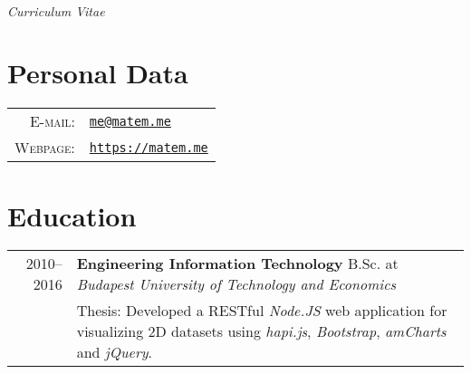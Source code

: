 \documentclass[a4paper,10pt]{article} %
\begin{document}
\pagestyle{empty} %

\par{}\\ \emph{Curriculum Vitae}\bigskip


\section{Personal Data}
\begin{tabular}{rl}
\textsc{E-mail:} & \href{mailto:me@matem.me}{\texttt{me@matem.me}} \\
\textsc{Webpage:} & \href{https://matem.me}{\texttt{https://matem.me}}
\end{tabular}


\section{Education}
\begin{tabular}{r|p{12.5cm}}
\textsc{2010--2016} & \textbf{Engineering Information Technology} B.Sc. at \emph{Budapest University of Technology and Economics}\\
& \footnotesize{Thesis: } Developed a RESTful \emph{Node.JS} web application for visualizing 2D datasets using \emph{hapi.js}, \emph{Bootstrap}, \emph{amCharts}  and \emph{jQuery}.\\
\end{tabular}


\end{document}
